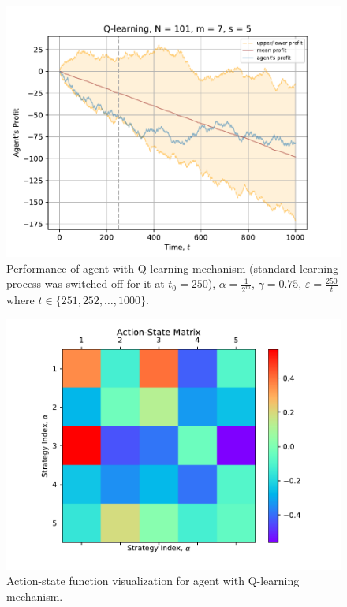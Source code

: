 \documentclass[12pt,american,czech]{article}
\begin{document}
\newpage{}

\begin{figure}[ht!]
\centering
\includegraphics[width=0.8\linewidth]{Images/figure_2}
\caption{Performance of agent with Q-learning mechanism (standard learning process was switched off for it at $t_{0}=250$), $\alpha=\tfrac{1}{2^{m}}$, $\gamma=0.75$, $\varepsilon=\tfrac{250}{t}$ where $t\in\{251,252,\dots,1000\}$.}
\label{fig:figure_3}
\end{figure}

\begin{figure}[ht!]
\centering
\includegraphics[width=0.8\linewidth]{Images/figure_3}
\caption{Action-state function visualization for agent with Q-learning mechanism.}
\label{fig:figure_4}
\end{figure}

\newpage{}
\end{document}
